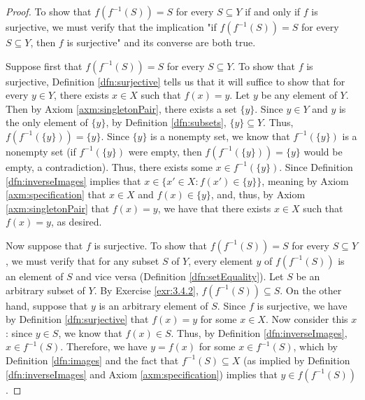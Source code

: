 \documentclass[../main.tex]{subfiles}
\begin{document}
\begin{enumerate}[ref={\thesection.\arabic*}]
    \begin{proof}
        To show that $f(f^{-1}(S))=S$ for every $S\subseteq Y$ if and only if $f$ is surjective, we must verify that the implication "if $f(f^{-1}(S))=S$ for every $S\subseteq Y$, then $f$ is surjective" and its converse are both true.\par
        Suppose first that $f(f^{-1}(S))=S$ for every $S\subseteq Y$. To show that $f$ is surjective, Definition \ref{dfn:surjective} tells us that it will suffice to show that for every $y\in Y$, there exists $x\in X$ such that $f(x)=y$. Let $y$ be any element of $Y$. Then by Axiom \ref{axm:singletonPair}, there exists a set $\{y\}$. Since $y\in Y$ and $y$ is the only element of $\{y\}$, by Definition \ref{dfn:subsets}, $\{y\}\subseteq Y$. Thus, $f(f^{-1}(\{y\}))=\{y\}$. Since $\{y\}$ is a nonempty set, we know that $f^{-1}(\{y\})$ is a nonempty set (if $f^{-1}(\{y\})$ were empty, then $f(f^{-1}(\{y\}))=\{y\}$ would be empty, a contradiction). Thus, there exists some $x\in f^{-1}(\{y\})$. Since Definition \ref{dfn:inverseImages} implies that $x\in\{x'\in X:f(x')\in\{y\}\}$, meaning by Axiom \ref{axm:specification} that $x\in X$ and $f(x)\in\{y\}$, and, thus, by Axiom \ref{axm:singletonPair} that $f(x)=y$, we have that there exists $x\in X$ such that $f(x)=y$, as desired.\par
        Now suppose that $f$ is surjective. To show that $f(f^{-1}(S))=S$ for every $S\subseteq Y$, we must verify that for any subset $S$ of $Y$, every element $y$ of $f(f^{-1}(S))$ is an element of $S$ and vice versa (Definition \ref{dfn:setEquality}). Let $S$ be an arbitrary subset of $Y$. By Exercise \ref{exr:3.4.2}, $f(f^{-1}(S))\subseteq S$. On the other hand, suppose that $y$ is an arbitrary element of $S$. Since $f$ is surjective, we have by Definition \ref{dfn:surjective} that $f(x)=y$ for some $x\in X$. Now consider this $x$: since $y\in S$, we know that $f(x)\in S$. Thus, by Definition \ref{dfn:inverseImages}, $x\in f^{-1}(S)$. Therefore, we have $y=f(x)$ for some $x\in f^{-1}(S)$, which by Definition \ref{dfn:images} and the fact that $f^{-1}(S)\subseteq X$ (as implied by Definition \ref{dfn:inverseImages} and Axiom \ref{axm:specification}) implies that $y\in f(f^{-1}(S))$.\par\medskip

\end{proof}
\end{enumerate}
\end{document}
